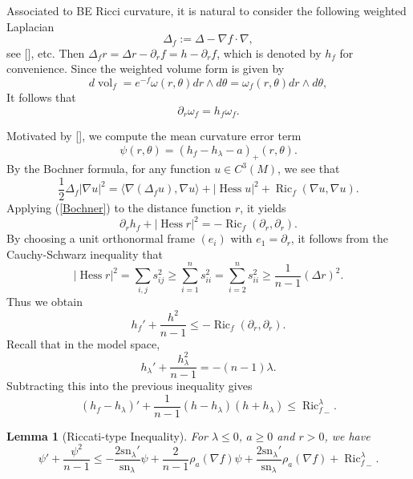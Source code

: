 \documentclass[11pt]{amsart}
\numberwithin{equation}{section}
\newtheorem{lemma}[theorem]{Lemma}
\newcommand{\sn}{\mathrm{sn}}
\begin{document}
Associated to  BE Ricci curvature, it is natural to consider the following weighted Laplacian
\[
\Delta_f:=\Delta-\nabla f\cdot\nabla,
\]
see [\cite{WZ, TZZ}], etc. Then $\Delta_f r=\Delta r-\partial_rf=h-\partial_rf$,  which is  denoted  by $h_f$ for convenience.  Since the weighted volume form is given by
\[
d\operatorname{vol}_f=e^{-f}\omega(r,\theta) dr\wedge d\theta=\omega_f(r,\theta) dr\wedge d\theta,
\]
It follows that
 $$\partial_r\omega_f=h_f\omega_f.$$

Motivated  by [\cite{PW}],  we compute the mean curvature error term
\begin{equation}
	\psi(r,\theta)=(h_f-h_\lambda-a)_+(r,\theta).\label{error}
\end{equation}
By the Bochner formula, for any function $u\in C^3(M)$, we see that
	\begin{equation}
	\frac{1}{2}\Delta_f|\nabla u|^2=\langle\nabla(\Delta_fu),\nabla u\rangle+|\operatorname{Hess}u|^2+\operatorname{Ric}_f(\nabla u,\nabla u).\label{Bochner}
	\end{equation}
Applying (\ref{Bochner})
 to  the distance function $r$,  it yields
\[
\partial_rh_f+|\operatorname{Hess}r|^2=-\operatorname{Ric}_f(\partial_r,\partial_r).
\]
By choosing  a unit orthonormal frame $(e_i)$ with $e_1=\partial_r$,   it follows  from the Cauchy-Schwarz inequality that
\[
|\operatorname{Hess}r|^2=\sum_{i,j}s_{ij}^2\geq \sum_{i=1}^ns_{ii}^2=\sum_{i=2}^{n}s_{ii}^2\geq \frac{1}{n-1}(\Delta r)^2.
\]
Thus we obtain
\[
h_f'+\frac{h^2}{n-1}\leq -\operatorname{Ric}_f(\partial_r,\partial_r).
\]
Recall that in the model space,
\[
h_\lambda'+\frac{h_\lambda^2}{n-1}=-(n-1)\lambda.
\]
Subtracting this into  the previous inequality gives
\begin{equation}
\left(h_f-h_\lambda\right)'+\frac{1}{n-1}\left(h-h_\lambda\right)\left(h+h_\lambda\right)\leq  {\operatorname{Ric}_f^\lambda}_-.\label{pre-r-ineq}
\end{equation}


\begin{lemma}[Riccati-type Inequality]\label{riccati}
	For  $\lambda\leq 0$, $a\geq 0$ and $r>0$,   we have
	\begin{equation}
		\psi'+\frac{\psi^2}{n-1}\leq -\frac{2\sn_\lambda'}{\sn_\lambda}\psi+\frac{2}{n-1}\rho_a(\nabla f)\psi+\frac{2\sn_\lambda'}{\sn_\lambda}\rho_a(\nabla f)+{\operatorname{Ric}_f^\lambda}_-.\label{rineq}
	\end{equation}
\end{lemma}
\end{document}
